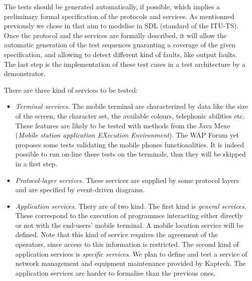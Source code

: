      The tests should be generated automatically, if possible, which
     implies a preliminary formal specification of the protocols and
     services. As mentionned previously we chose in that aim to
     modelise in SDL (standard of the ITU-TS). Once the protocol and
     the services are formally described, it will allow the automatic
     generation of the test sequences guaranting a coverage of the
     given specification, and allowing to detect different kind of
     faults, like output faults. The last step is the implementation
     of these test cases in a test architecture by a demonstrator.

     There are three kind of services to be tested:

     \begin{itemize}

       \item \emph{Terminal services.} The mobile terminal are
             characterized by data like the size of the screen, the
             character set, the available colours, telephonic abilities
             etc. These features are likely to be tested with methods
             from the Java Mexe (\emph{Mobile station application
             EXecution Environment}). The WAP Forum yet proposes some
             tests validating the mobile phones functionalities. It is
             indeed possible to run on-line these tests on the
             terminals, thus they will be skipped in a first step.

       \item \emph{Protocol-layer services.} These services are
             supplied by some protocol layers and are specified by
             event-driven diagrams.

       \item \emph{Application services.} Thery are of two kind. The
             first kind is \emph{general services}. These correspond
             to the execution of programmes interacting either
             directly or not with the end-users' mobile terminal. A
             mobile location service will be defined. Note that this
             kind of service requires the agreement of the operators,
             since access to this information is restricted. The
             second kind of application services is \emph{specific
             services}. We plan to define and test a service of
             network management and equipment maintenance provided by
             Kaptech. The application services are harder to formalise
             than the previous ones.

     \end{itemize}


